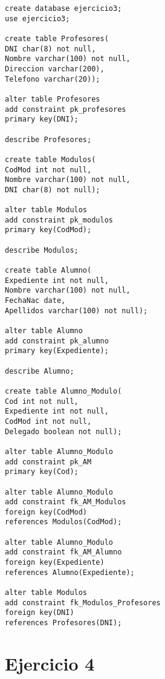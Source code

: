 \documentclass[a4paper,12pt]{article}
\begin{document}
\begin{lstlisting}
create database ejercicio3;
use ejercicio3;

create table Profesores(
DNI char(8) not null,
Nombre varchar(100) not null,
Direccion varchar(200),
Telefono varchar(20));

alter table Profesores
add constraint pk_profesores
primary key(DNI);

describe Profesores;

create table Modulos(
CodMod int not null,
Nombre varchar(100) not null,
DNI char(8) not null);

alter table Modulos
add constraint pk_modulos
primary key(CodMod);

describe Modulos;

create table Alumno(
Expediente int not null,
Nombre varchar(100) not null,
FechaNac date,
Apellidos varchar(100) not null);

alter table Alumno
add constraint pk_alumno
primary key(Expediente);

describe Alumno;

create table Alumno_Modulo(
Cod int not null,
Expediente int not null,
CodMod int not null,
Delegado boolean not null);

alter table Alumno_Modulo
add constraint pk_AM
primary key(Cod);

alter table Alumno_Modulo
add constraint fk_AM_Modulos
foreign key(CodMod)
references Modulos(CodMod);

alter table Alumno_Modulo
add constraint fk_AM_Alumno
foreign key(Expediente)
references Alumno(Expediente);

alter table Modulos
add constraint fk_Modulos_Profesores
foreign key(DNI)
references Profesores(DNI);
\end{lstlisting}

\section{Ejercicio 4}
\end{document}
